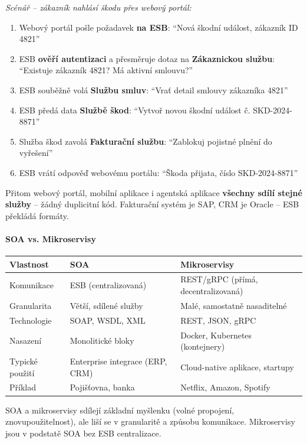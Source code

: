 \textit{Scénář -- zákazník nahlásí škodu přes webový portál:}
\begin{enumerate}
  \item Webový portál pošle požadavek \textbf{na ESB}: ``Nová škodní událost, zákazník ID 4821''
  \item ESB \textbf{ověří autentizaci} a přesměruje dotaz na \textbf{Zákaznickou službu}:
    ``Existuje zákazník 4821? Má aktivní smlouvu?''
  \item ESB souběžně volá \textbf{Službu smluv}: ``Vrať detail smlouvy zákazníka 4821''
  \item ESB předá data \textbf{Službě škod}: ``Vytvoř novou škodní událost č. SKD-2024-8871''
  \item Služba škod zavolá \textbf{Fakturační službu}: ``Zablokuj pojistné plnění do vyřešení''
  \item ESB vrátí odpověď webovému portálu: ``Škoda přijata, číslo SKD-2024-8871''
\end{enumerate}

Přitom webový portál, mobilní aplikace i agentská aplikace \textbf{všechny sdílí stejné služby}
-- žádný duplicitní kód. Fakturační systém je SAP, CRM je Oracle -- ESB překládá formáty.

\paragraph{SOA vs. Mikroservisy}
\begin{center}
\begin{tabular}{lll}
\toprule
\textbf{Vlastnost} & \textbf{SOA} & \textbf{Mikroservisy} \\
\midrule
Komunikace & ESB (centralizovaná) & REST/gRPC (přímá, decentralizovaná) \\
Granularita & Větší, sdílené služby & Malé, samostatně nasaditelné \\
Technologie & SOAP, WSDL, XML & REST, JSON, gRPC \\
Nasazení & Monolitické bloky & Docker, Kubernetes (kontejnery) \\
Typické použití & Enterprise integrace (ERP, CRM) & Cloud-native aplikace, startupy \\
Příklad & Pojišťovna, banka & Netflix, Amazon, Spotify \\
\bottomrule
\end{tabular}
\end{center}

SOA a mikroservisy sdílejí základní myšlenku (volné propojení, znovupoužitelnost), ale liší se
v granularitě a způsobu komunikace. Mikroservisy jsou v podstatě SOA bez ESB centralizace.

